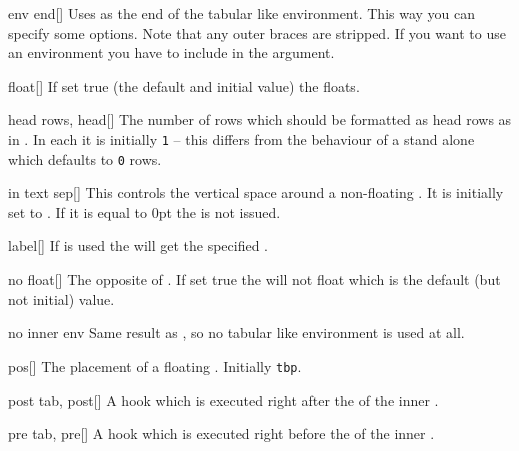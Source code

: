 \begin{describeopt}{env end}[]%
  Uses  as the end of the tabular like environment. This way you can
  specify some options. Note that any outer braces are stripped. If you want to
  use an environment you have to include  in the argument.
\end{describeopt}%
\begin{describeopt}{float}[]%
  If set true (the default and initial value) the  floats.
\end{describeopt}%
\begin{describeopt}{head rows, head}[]%
  The number of rows which should be formatted as head rows as in
  . In each  it is initially \texttt{1} -- this
  differs from the behaviour of a stand alone  which defaults to
  \texttt{0} rows.
\end{describeopt}%
\begin{describeopt}{in text sep}[]%
  This controls the vertical space around a non-floating . It is
  initially set to . If it is equal to 0pt the  is not
  issued.
\end{describeopt}%
\begin{describeopt}{label}[]%
  If  is used the  will get the specified
  .
\end{describeopt}%
\begin{describeopt}{no float}[]%
  The opposite of . If set true the  will not float
  which is the default (but not initial) value.
\end{describeopt}%
\begin{describeopt}{no inner env}%
  Same result as , so no tabular like
  environment is used at all.
\end{describeopt}%
\begin{describeopt}{pos}[]%
  The placement of a floating . Initially \texttt{tbp}.
\end{describeopt}%
\begin{describeopt}{post tab, post}[]%
  A hook which is executed right after the  of the inner
  .
\end{describeopt}%
\begin{describeopt}{pre tab, pre}[]%
  A hook which is executed right before the  of the inner
  .
\end{describeopt}%
